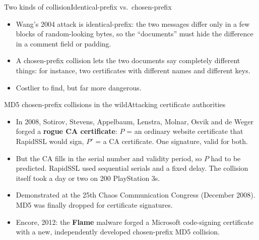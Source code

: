 \ifdefined\PRESENTATION\else\PassOptionsToClass{handout}{beamer}\fi\documentclass[aspectratio=169, lualatex]{beamer}
\begin{document}
\begin{frame}{Two kinds of collision}{Identical-prefix vs.\ chosen-prefix}
	\begin{itemize}
		\item Wang's 2004 attack is identical-prefix: the two messages differ only in a few blocks of random-looking bytes, so the ``documents'' must hide the difference in a comment field or padding.
		\item A chosen-prefix collision lets the two documents say completely different things: for instance, two certificates with different names and different keys.
		\item Costlier to find, but far more dangerous.
	\end{itemize}
\end{frame}

\begin{frame}{MD5 chosen-prefix collisions in the wild}{Attacking certificate authorities}
	\begin{itemize}
		\item In 2008, Sotirov, Stevens, Appelbaum, Lenstra, Molnar, Osvik and de Weger forged a \textbf{rogue CA certificate}: $P$ = an ordinary website certificate that RapidSSL would sign, $P'$ = a CA certificate. One signature, valid for both.
		\item But the CA fills in the serial number and validity period, so $P$ had to be predicted. RapidSSL used sequential serials and a fixed delay. The collision itself took a day or two on 200 PlayStation 3s.
		\item Demonstrated at the 25th Chaos Communication Congress (December 2008). MD5 was finally dropped for certificate signatures.
		\item Encore, 2012: the \textbf{Flame} malware forged a Microsoft code-signing certificate with a new, independently developed chosen-prefix MD5 collision.
	\end{itemize}
\end{frame}
\end{document}
